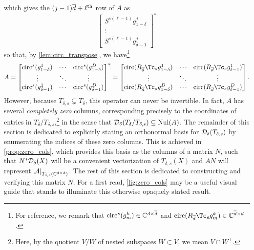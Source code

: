 which gives the $(j - 1) \overline{d} + \ell^{\text{th}}$ row of $A$ as \[\begin{bmatrix} S^{s (\ell - 1)} g_{1 - \delta}^j \\ \vdots \\ S^{s (\ell - 1)} g_{\delta - 1}^j \end{bmatrix}^*\] so that, by \cref{lem:circ_transpose}, we have\footnote{For reference, we remark that $\operatorname{circ}^s(g_m^k) \in \mathbb{C}^{d \times \overline{d}}$ and $\circop(R_{\dbar} \Tc_s g_m^k) \in \C^{\dbar \times d}$.} \begin{equation} A = \begin{bmatrix} \circop^s(g_{1 - \delta}^1) & \cdots & \circop^s(g_{1 - \delta}^D) \\ \vdots & \ddots & \vdots \\ \circop^s(g_{\delta - 1}^1) & \cdots & \circop^s(g_{\delta - 1}^D) \end{bmatrix}^* = \begin{bmatrix} \circop(R_{\dbar} \Tc_s g_{1 - \delta}^1) & \cdots & \circop(R_{\dbar} \Tc_s g_{\delta - 1}^1) \\ \vdots & \ddots & \vdots \\ \circop(R_{\dbar} \Tc_s g_{1 - \delta}^D) & \cdots & \circop(R_{\dbar} \Tc_s g_{\delta - 1}^D) \end{bmatrix}. \label{eq:A_block_ptych} \end{equation}  However, because $T_{\delta, s} \subsetneq T_\delta$, this operator can never be invertible.  In fact, $A$ has several \emph{completely zero} columns, corresponding precisely to the coordinates of entries in $T_\delta / T_{\delta, s}$,\footnote{Here, by the quotient $V / W$ of nested subspaces $W \subset V$, we mean $V \cap W^\perp$.} in the sense that $\mathcal{D}_\delta(T_\delta / T_{\delta, s}) \subseteq \operatorname{Nul}(A)$.  The remainder of this section is dedicated to explicitly stating an orthonormal basis for $\mathcal{D}_\delta(T_{\delta, s})$ by enumerating the indices of these zero columns.  This is achieved in \cref{prop:zero_cols}, which provides this basis as the columns of a matrix $N$, such that $N^* \mathcal{D}_\delta(X)$ will be a convenient vectorization of $T_{\delta, s}(X)$ and $A N$ will represent $\left.\mathcal{A}\right|_{T_{\delta, s}(\mathbb{C}^{d \times d})}$.  The rest of this section is dedicated to constructing and verifying this matrix $N$.  For a first read, \cref{fig:zero_cols} may be a useful visual guide that stands to illuminate this otherwise opaquely stated result.

